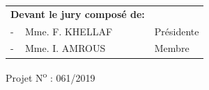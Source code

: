 \documentclass[12pt , a4paper]{report}
\begin{document}
	\vspace*{0.5cm}
	
	\begin{table}[h]
		\begin{tabular}{p{6.5cm}p{5cm}}
			\textbf{Devant le jury composé de:}&\\
			- \,\,\, Mme. F. KHELLAF & Présidente \\
			- \,\,\, Mme. I. AMROUS & Membre \\
		\end{tabular}
	\end{table}
	\vspace*{2.4cm}
	\begin{center}
		Projet N\textsuperscript{o} : 061/2019
	\end{center}
\end{document}
